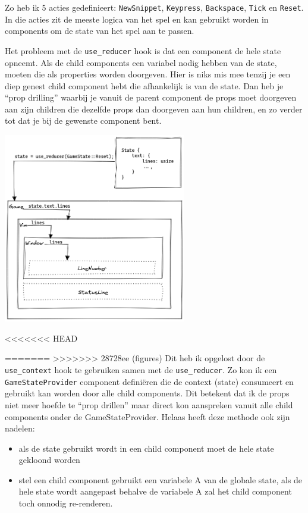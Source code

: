 Zo heb ik 5 acties gedefinieert: \texttt{NewSnippet}, \texttt{Keypress},
\texttt{Backspace}, \texttt{Tick} en \texttt{Reset}. In die acties zit
de meeste logica van het spel en kan gebruikt worden in components om de state van het spel aan te
passen. 

Het probleem met de \texttt{use_reducer} hook is dat een component de hele state opneemt.
Als de child components een variabel nodig hebben van de state, moeten die als properties worden
doorgeven. Hier is niks mis mee tenzij je een diep genest child component hebt die afhankelijk is
van de state. Dan heb je “prop drilling” waarbij je vanuit de parent component de props moet
doorgeven aan zijn children die dezelfde props dan doorgeven aan hun children, en zo verder tot dat
je bij de gewenste component bent.


\centering
\includegraphics[width=0.6\textwidth]{./figures/use_reducer.png}


<<<<<<< HEAD

=======
>>>>>>> 28728ee (figures)
Dit heb ik opgelost door de \texttt{use_context} hook te gebruiken samen met de
\texttt{use_reducer}. Zo kon ik een \texttt{GameStateProvider} component
definiëren die de context (state) consumeert en gebruikt kan worden door alle child components. Dit
betekent dat ik de props niet meer hoefde te “prop drillen” maar direct kon aanspreken vanuit alle
child components onder de GameStateProvider. Helaas heeft deze methode ook zijn nadelen: 
\begin{itemize}
    \item als de state gebruikt wordt in een child component moet de hele state gekloond worden 

    \item stel een child component gebruikt een variabele A van de globale state, als de hele state
    wordt aangepast behalve de variabele A zal het child component toch onnodig re-renderen. 
\end{itemize}

